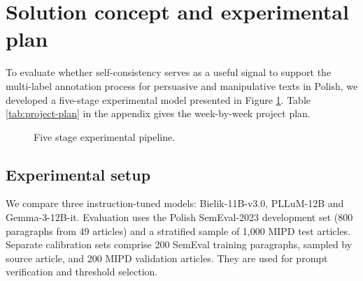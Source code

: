 \documentclass[11pt]{article}
\begin{document}
\section{Solution concept and experimental plan}
To evaluate whether self-consistency serves as a useful signal to support the multi-label annotation process for persuasive and manipulative texts in Polish, we developed a five-stage experimental model presented in Figure \ref{fig:pipeline}. Table \ref{tab:project-plan} in the appendix gives the week-by-week project plan.

\begin{figure}[t!]
\centering
{}
\caption{Five stage experimental pipeline.}
\label{fig:pipeline}
\end{figure}

\subsection{Experimental setup}

We compare three instruction-tuned models: Bielik-11B-v3.0,
PLLuM-12B and Gemma-3-12B-it. Evaluation uses the Polish
SemEval-2023 development set (800 paragraphs from 49 articles)
and a stratified sample of 1,000 MIPD test articles.
Separate calibration sets comprise 200 SemEval training paragraphs,
sampled by source article, and 200 MIPD validation articles.
They are used for prompt verification and threshold selection.
\end{document}
